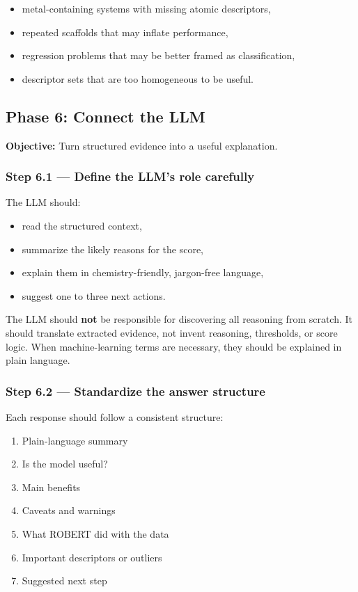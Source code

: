 \documentclass[11pt]{article}
\begin{document}
\begin{itemize}
    \item metal-containing systems with missing atomic descriptors,
    \item repeated scaffolds that may inflate performance,
    \item regression problems that may be better framed as classification,
    \item descriptor sets that are too homogeneous to be useful.
\end{itemize}

\subsection{Phase 6: Connect the LLM}
\textbf{Objective:} Turn structured evidence into a useful explanation.

\subsubsection*{Step 6.1 --- Define the LLM's role carefully}
The LLM should:

\begin{itemize}
    \item read the structured context,
    \item summarize the likely reasons for the score,
    \item explain them in chemistry-friendly, jargon-free language,
    \item suggest one to three next actions.
\end{itemize}

The LLM should \textbf{not} be responsible for discovering all reasoning from scratch.
It should translate extracted evidence, not invent reasoning, thresholds, or score logic.
When machine-learning terms are necessary, they should be explained in plain language.

\subsubsection*{Step 6.2 --- Standardize the answer structure}
Each response should follow a consistent structure:

\begin{enumerate}
    \item Plain-language summary
    \item Is the model useful?
    \item Main benefits
    \item Caveats and warnings
    \item What ROBERT did with the data
    \item Important descriptors or outliers
    \item Suggested next step
\end{enumerate}
\end{document}
